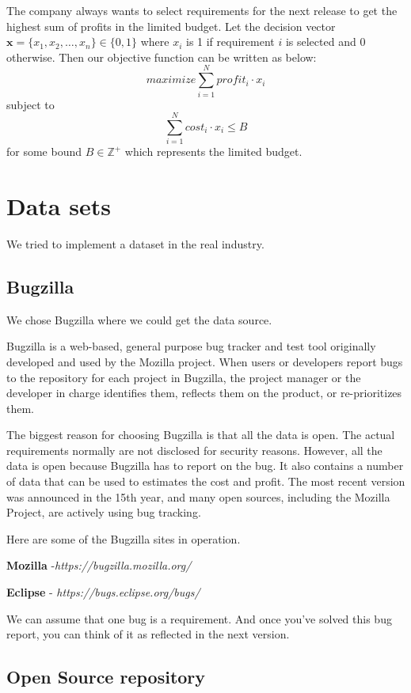 The company always wants to select requirements for the next release to get the highest sum of profits in the limited budget. Let the decision vector $\textbf{x} = \{x_1, x_2, \ldots, x_n\} \in \{0, 1\}$ where $x_i$ is 1 if requirement $i$ is selected and 0 otherwise. Then our objective function can be written as below:
\[
maximize \sum_{i = 1}^{N} profit_i \cdot x_i
\]
subject to
\[
\sum_{i = 1}^{N} cost_i \cdot x_i \leq B
\]
for some bound $B \in \mathbb{Z}^+$ which represents the limited budget.

\section{Data sets}
We tried to implement a dataset in the real industry.

\subsection{Bugzilla}

We chose Bugzilla where we could get the data source. 

Bugzilla is a web-based, general purpose bug tracker and test tool originally developed and used by the Mozilla project. When users or developers report bugs to the repository for each project in Bugzilla, the project manager or the developer in charge identifies them, reflects them on the product, or re-prioritizes them.

The biggest reason for choosing Bugzilla is that all the data is open. The actual requirements normally are not disclosed for security reasons. However, all the data is open because Bugzilla has to report on the bug. It also contains a number of data that can be used to estimates the cost and profit. The most recent version was announced in the 15th year, and many open sources, including the Mozilla Project, are actively using bug tracking.

Here are some of the Bugzilla sites in operation.

\textbf{Mozilla} -\textit{https://bugzilla.mozilla.org/}

\textbf{Eclipse} -\textit{ https://bugs.eclipse.org/bugs/}

We can assume that one bug is a requirement. And once you've solved this bug report, you can think of it as reflected in the next version.

\subsection{Open Source repository}

